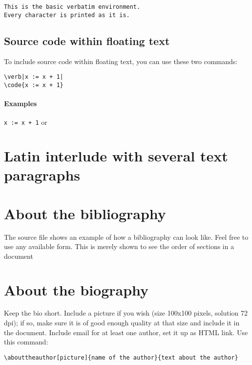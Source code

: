 \documentclass{jotarticle}
\begin{document}
\begin{verbatim}
This is the basic verbatim environment. 
Every character is printed as it is.
\end{verbatim}


\subsection{Source code within floating text}

To include source code within floating text, you can use these
two commands:

\begin{verbatim}
\verb|x := x + 1|
\code{x := x + 1}
\end{verbatim}

\paragraph{Examples} \verb|x := x + 1| or 


\section{Latin interlude with several text paragraphs}

\lipsum


\section{About the bibliography}

The source file shows an example of how a bibliography can look like.
Feel free to use any available form. This is merely shown to see the
order of sections in a document


\section{About the biography}


Keep the bio short. Include a picture if you wish (size 100x100 pixels,
solution 72 dpi); if so, make sure it is of good enough quality at 
that size and include it in the document. Include email for at 
least one author, set it up as HTML link. Use this command: 

\begin{verbatim}
\abouttheauthor[picture]{name of the author}{text about the author}
\end{verbatim}
\end{document}
